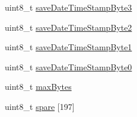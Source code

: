 \begin{DoxyCompactItemize}
\item 
uint8\-\_\-t \hyperlink{struct_g_q_l_l_c_1_1_g_q_g_m_c_1_1cfg__data__t_a436b78606c6234c45f067d63ff5a5aa6}{save\-Date\-Time\-Stamp\-Byte3}
\item 
uint8\-\_\-t \hyperlink{struct_g_q_l_l_c_1_1_g_q_g_m_c_1_1cfg__data__t_a4b486bc2e16237c0ed35ecd82493fe53}{save\-Date\-Time\-Stamp\-Byte2}
\item 
uint8\-\_\-t \hyperlink{struct_g_q_l_l_c_1_1_g_q_g_m_c_1_1cfg__data__t_ad951f68a3ee7af0804d033cb567ebb71}{save\-Date\-Time\-Stamp\-Byte1}
\item 
uint8\-\_\-t \hyperlink{struct_g_q_l_l_c_1_1_g_q_g_m_c_1_1cfg__data__t_a5e6f1ebb424dcab82b6c596c79a2c186}{save\-Date\-Time\-Stamp\-Byte0}
\item 
uint8\-\_\-t \hyperlink{struct_g_q_l_l_c_1_1_g_q_g_m_c_1_1cfg__data__t_a06a8060321a3ab8caf730be7f74bee67}{max\-Bytes}
\item 
uint8\-\_\-t \hyperlink{struct_g_q_l_l_c_1_1_g_q_g_m_c_1_1cfg__data__t_aa00eacbbb503dd9691a4edccf39468a8}{spare} \mbox{[}197\mbox{]}
\end{DoxyCompactItemize}


